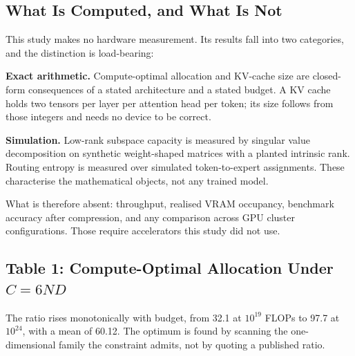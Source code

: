 \documentclass[10pt,journal,compsoc,twocolumn]{IEEEtran}
\begin{document}
\subsection{What Is Computed, and What Is Not}


This study makes no hardware measurement. Its results fall into two categories, and the distinction is load-bearing:

\textbf{Exact arithmetic.} Compute-optimal allocation and KV-cache size are closed-form consequences of a stated architecture and a stated budget. A KV cache holds two tensors per layer per attention head per token; its size follows from those integers and needs no device to be correct.

\textbf{Simulation.} Low-rank subspace capacity is measured by singular value decomposition on synthetic weight-shaped matrices with a planted intrinsic rank. Routing entropy is measured over simulated token-to-expert assignments. These characterise the mathematical objects, not any trained model.

What is therefore absent: throughput, realised VRAM occupancy, benchmark accuracy after compression, and any comparison across GPU cluster configurations. Those require accelerators this study did not use.


\subsection{Table 1: Compute-Optimal Allocation Under $C = 6ND$}
\begin{table}[htbp]
\centering
{}
\end{table}

The ratio rises monotonically with budget, from 32.1 at $10^{19}$ FLOPs to 97.7 at $10^{24}$, with a mean of 60.12. The optimum is found by scanning the one-dimensional family the constraint admits, not by quoting a published ratio.
\end{document}
